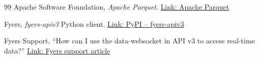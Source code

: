 \documentclass[11pt,a4paper]{article}
\begin{document}
\begin{thebibliography}{99}
 Apache Software Foundation, \emph{Apache Parquet}.
\href{https://parquet.apache.org/}{Link: Apache Parquet}

 Fyers, \emph{fyers-apiv3} Python client.
\href{https://pypi.org/project/fyers-apiv3/}{Link: PyPI -- fyers-apiv3}

 Fyers Support,
``How can I use the data-websocket in API v3 to access real-time data?''
\href{https://support.fyers.in/portal/en/kb/articles/how-can-i-use-the-data-websocket-in-api-v3-to-access-real-time-data}{Link: Fyers support article}

\end{thebibliography}
\end{document}
